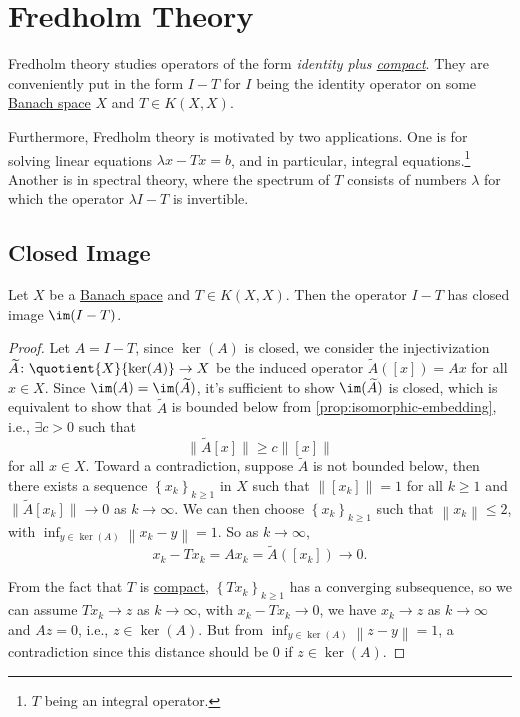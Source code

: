 \section{Fredholm Theory}
Fredholm theory studies operators of the form \emph{identity plus \hyperref[def:compact-op]{compact}}. They are conveniently put in the form \(I - T\) for \(I\) being the identity operator on some \hyperref[def:Banach-space]{Banach space} \(X\) and \(T\in K(X, X)\).

Furthermore, Fredholm theory is motivated by two applications. One is for solving linear equations \(\lambda x - Tx = b\), and in particular, integral equations.\footnote{\(T\) being an integral operator.} Another is in spectral theory, where the spectrum of \(T\) consists of numbers \(\lambda \) for which the operator \(\lambda I - T\) is invertible.
\subsection{Closed Image}
\begin{lemma}\label{lma:lec19}
	Let \(X\) be a \hyperref[def:Banach-space]{Banach space} and \(T\in K(X, X)\). Then the operator \(I-T\) has closed image \(\im(I-T)\).
\end{lemma}
\begin{proof}
	Let \(A=I-T\), since \(\ker (A)\) is closed, we consider the injectivization \(\widetilde{A} \colon \quotient{X}{\ker(A)}\to X\) be the induced operator \(\widetilde{A} ([x])=Ax\) for all \(x\in X\). Since \(\im(A) = \im(\widetilde{A} )\), it's sufficient to show \(\im(\widetilde{A} )\) is closed, which is equivalent to show that \(\widetilde{A} \) is bounded below from \autoref{prop:isomorphic-embedding}, i.e., \(\exists c>0\) such that
	\[
		\lVert \widetilde{A} [x]\rVert \geq c\left\lVert [x]\right\rVert
	\]
	for all \(x\in X\). Toward a contradiction, suppose \(\widetilde{A} \) is not bounded below, then there exists a sequence \(\left\{ x_k \right\} _{k\geq 1}\) in \(X\) such that \(\left\lVert [x_{k} ]\right\rVert = 1\) for all \(k\geq 1\) and \(\lVert \widetilde{A} [x_k] \rVert \to 0\) as \(k \to \infty \). We can then choose \(\left\{ x_{k}  \right\}_{k\geq 1} \) such that \(\left\lVert x_{k} \right\rVert \leq 2\), with \(\inf_{y\in \ker(A)} \left\lVert x_{k} -y\right\rVert=1 \). So as \(k\to \infty \),
	\[
		x_{k} - Tx_{k} = Ax_{k} = \widetilde{A} ([x_{k} ])\to 0.
	\]

	From the fact that \(T\) is \hyperref[def:compact-op]{compact}, \(\left\{ Tx_{k}  \right\}_{k\geq 1} \) has a converging subsequence, so we can assume \(Tx_{k} \to z\) as \(k\to \infty \), with \(x_{k} - Tx_{k} \to 0\), we have \(x_{k} \to z\) as \(k \to \infty \) and \(Az = 0\), i.e., \(z\in \ker(A)\). But from \(\inf _{y\in \ker(A)} \left\lVert z - y\right\rVert = 1\), a contradiction since this distance should be \(0\) if \(z\in \ker(A)\).
\end{proof}

